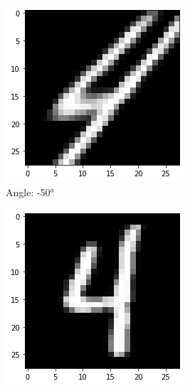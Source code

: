     \begin{figure}[!htbp]
        \centering
        \begin{subfigure}[b]{.3\textwidth}
            \includegraphics[width=\linewidth]{images/shear1.png}
            \caption{Angle: \ang{-50}}
            \label{fig:Rotate-misclass0}
        \end{subfigure}%
        \begin{subfigure}[b]{.3\textwidth}
            \includegraphics[width=\textwidth]{images/shear2.png}

\end{subfigure}
\end{figure}
